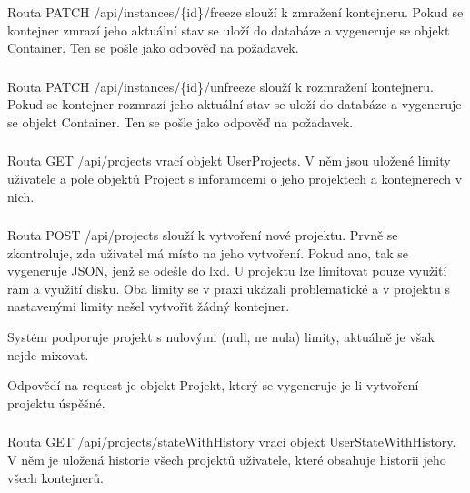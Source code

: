 \documentclass[a4paper,oneside,12pt]{report}
\begin{document}
Routa PATCH  /api/instances/\{id\}/freeze slouží k zmražení kontejneru.
Pokud se kontejner zmrazí jeho aktuální stav se uloží do databáze a vygeneruje se objekt Container.
Ten se pošle jako odpověď na požadavek.


\subsubsection{}

Routa PATCH  /api/instances/\{id\}/unfreeze slouží k rozmražení kontejneru.
Pokud se kontejner rozmrazí jeho aktuální stav se uloží do databáze a vygeneruje se objekt Container.
Ten se pošle jako odpověď na požadavek.


\subsubsection{\color{apiblue}{GET -- /api/projects}}

Routa GET /api/projects vrací objekt UserProjects.
V něm jsou uložené limity uživatele a pole objektů Project s inforamcemi o jeho projektech a kontejnerech v nich.

\subsubsection{\color{apigreen}{POST -- /api/projects}}

Routa POST /api/projects slouží k vytvoření nové projektu.
Prvně se zkontroluje, zda uživatel má místo na jeho vytvoření.
Pokud ano, tak se vygeneruje JSON, jenž se odešle do lxd.
U projektu lze limitovat pouze využití ram a využití disku.
Oba limity se v praxi ukázali problematické a v projektu s nastavenými limity nešel vytvořit žádný kontejner.

Systém podporuje projekt s nulovými (null, ne nula) limity, aktuálně je však nejde mixovat.

Odpovědí na request je objekt Projekt, který se vygeneruje je li vytvoření projektu úspěšné.

\subsubsection{\color{apiblue}{GET -- /api/projects/stateWithHistory}}

Routa GET /api/projects/stateWithHistory vrací objekt UserStateWithHistory.
V něm je uložená historie všech projektů uživatele, které obsahuje historii jeho všech kontejnerů.
\end{document}

